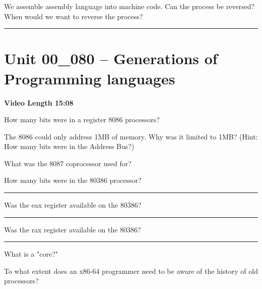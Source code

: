 \documentclass[letterpaper,12pt]{exam}
\newcommand{\unit}{Unit 00}
\begin{document}
\begin{questions}
\begin{samepage}
     \question We assemble assembly language into machine code.  Can the process be reversed?  When would we want to reverse the process?
     \vspace{5mm}
 \end{samepage}
 

 \rule{0.5\textwidth}{.4pt} %
\section*{\unit\_080 -- Generations of Programming languages}
\par{\selectfont\textbf{Video Length 15:08}}
\begin{samepage}
    \question How many bits were in a register 8086 processors?  
    \vspace{5mm}
\end{samepage}
\begin{samepage}
    \question The 8086 could only address 1MB of memory.  Why was it limited to 1MB? (Hint: How many bits were in the Address Bus?)
    \vspace{5mm}
\end{samepage}
\par
\begin{samepage}
    \question What was the 8087 coprocessor used for?
    \vspace{5mm}
\end{samepage}


  \begin{samepage}
      \question How many bits were in the 80386 processor? \rule{1cm}{0.15mm}
        \vspace{5mm}
      \par Was the eax register available on the 80386? \rule{1cm}{0.15mm}
       \vspace{5mm}
      \par Was the rax register available on the 80386? \rule{1cm}{0.15mm}
  \end{samepage}
\begin{samepage}
    \question What is a "core?"
    \vspace{5mm}
\end{samepage}
\par
 \begin{samepage}
     \question To what extent does an x86-64 programmer need to be aware of the history of old processors?
     \vspace{5mm}
 \end{samepage}
 \par

\end{questions}
\end{document}

